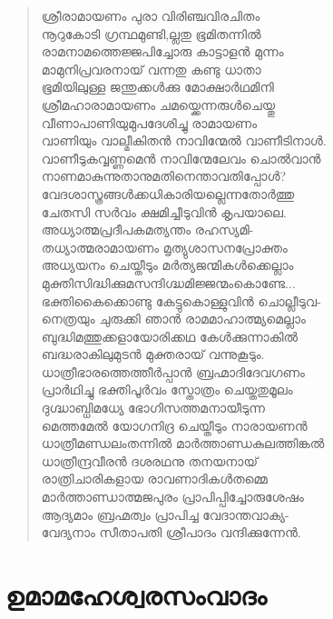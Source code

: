 \begin{verse}
ശ്രീരാമായണം പുരാ വിരിഞ്ചവിരചിതം\\
നൂറുകോടി ഗ്രന്ഥമുണ്ടി,ല്ലതു ഭൂമിതന്നില്‍\\
രാമനാമത്തെജ്ജപിച്ചോരു കാട്ടാളന്‍ മുന്നം\\
മാമുനിപ്രവരനായ് വന്നതു കണ്ടു ധാതാ\\
ഭൂമിയിലുള്ള ജന്തുക്കള്‍ക്കു മോക്ഷാര്‍ഥമിനി\\
ശ്രീമഹാരാമായണം ചമയ്ക്കെന്നരുള്‍ചെയ്തു\\
വീണാപാണിയുമുപദേശിച്ചു രാമായണം\\
വാണിയും വാല്മീകിതന്‍ നാവിന്മേല്‍ വാണീടിനാള്‍.\\
വാണീടുകവ്വണ്ണമെന്‍ നാവിന്മേലേവം ചൊല്‍വാന്‍\\
നാണമാകുന്നുതാനുമതിനെന്താവതിപ്പോള്‍?\\
വേദശാസ്ത്രങ്ങള്‍ക്കധികാരിയല്ലെന്നതോര്‍ത്തു\\
ചേതസി സര്‍വം ക്ഷമിച്ചീടുവിന്‍ കൃപയാലെ.\\
അധ്യാത്മപ്രദീപകമത്യന്തം രഹസ്യമി-\\
തധ്യാത്മരാമായണം മൃത്യുശാസനപ്രോക്തം\\
അധ്യയനം ചെയ്തീടും മര്‍ത്യജന്മികള്‍ക്കെല്ലാം\\
മുക്തിസിദ്ധിക്കുമസന്ദിഗ്ദ്ധമിജ്ജന്മംകൊണ്ടേ...\\
ഭക്തികൈക്കൊണ്ടു കേട്ടുകൊള്ളുവിന്‍ ചൊല്ലീടുവ-\\
നെത്രയും ചുരുക്കി ഞാന്‍ രാമമാഹാത്മ്യമെല്ലാം\\
ബുദ്ധിമത്തുക്കളായോരിക്കഥ കേള്‍ക്കുന്നാകില്‍\\
ബദ്ധരാകിലുമുടന്‍ മുക്തരായ് വന്നുകൂടും.\\
ധാത്രീഭാരത്തെത്തീര്‍പ്പാന്‍ ബ്രഹ്മാദിദേവഗണം\\
പ്രാര്‍ഥിച്ചു ഭക്തിപൂര്‍വം സ്തോത്രം ചെയ്തതുമൂലം\\
ദുഗ്ദ്ധാബ്ധിമധ്യേ ഭോഗിസത്തമനായീടുന്ന\\
മെത്തമേല്‍ യോഗനിദ്ര ചെയ്തീടും നാരായണന്‍\\
ധാത്രീമണ്ഡലംതന്നില്‍ മാര്‍ത്താണ്ഡകുലത്തിങ്കല്‍\\
ധാത്രീന്ദ്രവീരന്‍ ദശരഥനു തനയനായ്\\
രാത്രിചാരികളായ രാവണാദികള്‍തമ്മെ\\
മാര്‍ത്താണ്ഡാത്മജപുരം പ്രാപിപ്പിച്ചോരുശേഷം\\
ആദ്യമാം ബ്രഹ്മത്വം പ്രാപിച്ച വേദാന്തവാക്യ-\\
വേദ്യനാം സീതാപതി ശ്രീപാദം വന്ദിക്കുന്നേന്‍.
\end{verse}

\section{ഉമാമഹേശ്വരസംവാദം}

